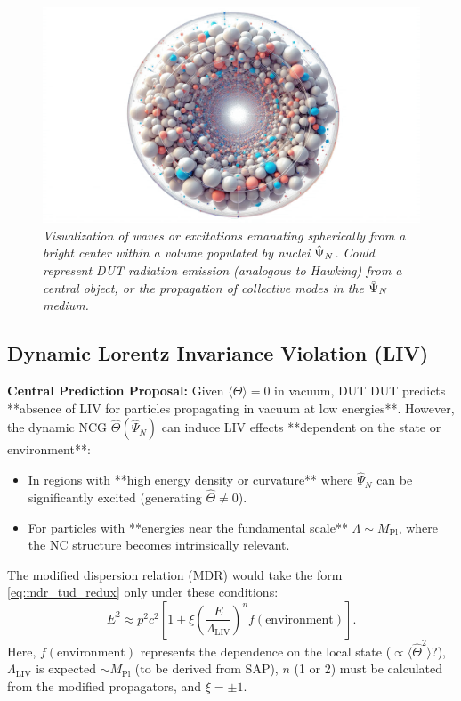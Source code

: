 \documentclass[11pt, a4paper]{article}
\theoremstyle{remark}
\newcommand{\Op}[1]{\hat{#1}}
\newcommand{\Mpl}{M_{\mathrm{Pl}}}
\begin{document}
\begin{figure}[htbp]
    \centering
    \includegraphics[width=0.6\linewidth]{OIG10.ZNLJ.PNG}
    \caption{%
      \footnotesize\textit{Visualization of waves or excitations emanating spherically from a bright center within a volume populated by nuclei \(\protect\Op{\Psi}_N\). Could represent DUT radiation emission (analogous to Hawking) from a central object, or the propagation of collective modes in the \(\protect\Op{\Psi}_N\) medium.}
    }
    \label{fig:Figura13}
\end{figure}

\subsection{Dynamic Lorentz Invariance Violation (LIV)}
\label{subsec:liv_specific_final_revised}

\textbf{Central Prediction Proposal:}
Given \( \langle \Op{\Theta} \rangle = 0 \) in vacuum, DUT DUT predicts **absence of LIV for particles propagating in vacuum at low energies**. However, the dynamic NCG \( \Op{\Theta}(\Op{\Psi}_N) \) can induce LIV effects **dependent on the state or environment**:
\begin{itemize}
    \item In regions with **high energy density or curvature** where \( \Op{\Psi}_N \) can be significantly excited (generating \( \Op{\Theta} \neq 0 \)).
    \item For particles with **energies near the fundamental scale** \( \Lambda \sim \Mpl \), where the NC structure becomes intrinsically relevant.
\end{itemize}
The modified dispersion relation (MDR) would take the form \eqref{eq:mdr_tud_redux} only under these conditions:
\begin{equation} \label{eq:mdr_tud_redux}
E^2 \approx p^2c^2 \left[ 1 + \xi \left(\frac{E}{\Lambda_{\text{LIV}}}\right)^n f(\text{environment}) \right].
\end{equation}
Here, \( f(\text{environment}) \) represents the dependence on the local state (\( \propto \langle \Op{\Theta}^2 \rangle \)?), \( \Lambda_{\text{LIV}} \) is expected \( \sim \Mpl \) (to be derived from SAP), \( n \) (1 or 2) must be calculated from the modified propagators, and \( \xi = \pm 1 \).
\end{document}
